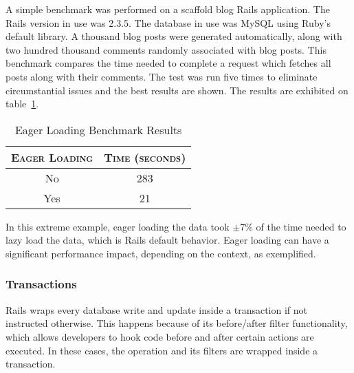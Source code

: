 A simple benchmark was performed on a scaffold blog Rails application. The Rails version in use was 2.3.5. The database in use was MySQL using Ruby's default library. A thousand blog posts were generated automatically, along with two hundred thousand comments randomly associated with blog posts. This benchmark compares the time needed to complete a request which fetches all posts along with their comments. The test was run five times to eliminate circumstantial issues and the best results are shown. The results are exhibited on table~\ref{tab:eager_loading}.
\begin{table}[h!t]
  \centering
  \caption{Eager Loading Benchmark Results}
  \label{tab:eager_loading}
  
  \begin{tabular}{c|c}
  
    \textbf{\textsc{Eager Loading}} & \textbf{\textsc{Time (seconds)}} \\
    \hline
    No & 283 \\ \hline
    Yes & 21 \\
  \end{tabular}
\end{table}

In this extreme example, eager loading the data took $\pm$7\% of the time needed to lazy load the data, which is Rails default behavior. Eager loading can have a significant performance impact, depending on the context, as exemplified.


\subsubsection{Transactions}
Rails wraps every database write and update inside a transaction if not instructed otherwise. This happens because of its before/after filter functionality, which allows developers to hook code before and after certain actions are executed. In these cases, the operation and its filters are wrapped inside a transaction.

